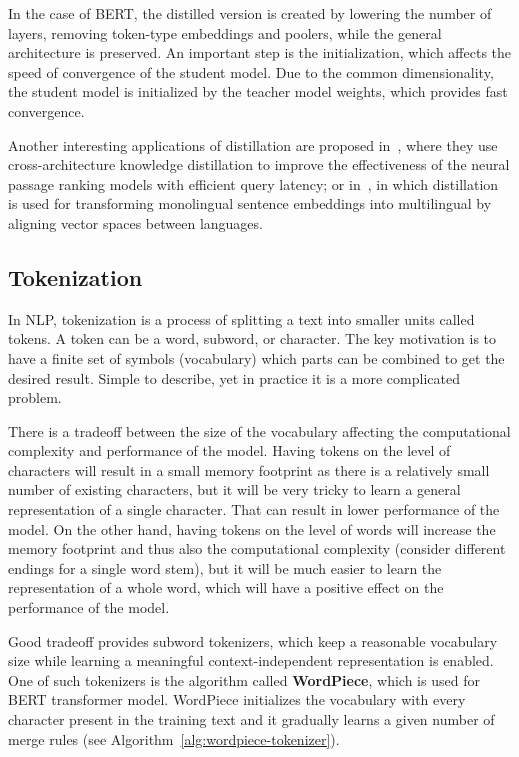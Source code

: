     In the case of BERT, the distilled version is created by lowering the number of layers, removing token-type embeddings and poolers, while the general architecture is preserved. An important step is the initialization, which affects the speed of convergence of the student model. Due to the common dimensionality, the student model is initialized by the teacher model weights, which provides fast convergence.~\parencite{Sanh2019DistilBERTAD}
    
    Another interesting applications of distillation are proposed in~\parencite{hofstaetter2020_crossarchitecture_kd}, where they use cross-architecture knowledge distillation to improve the effectiveness of the neural passage ranking models with efficient query latency; or in~\parencite{Reimers_2020-distillation-multiling}, in which distillation is used for transforming monolingual sentence embeddings into multilingual by aligning vector spaces between languages.

\subsection{Tokenization}
\label{section:tokenization}
    In NLP, tokenization is a process of splitting a text into smaller units called tokens. A token can be a word, subword, or character. The key motivation is to have a finite set of symbols (vocabulary) which parts can be combined to get the desired result. Simple to describe, yet in practice it is a more complicated problem. 
    
    There is a tradeoff between the size of the vocabulary affecting the computational complexity and performance of the model. Having tokens on the level of characters will result in  a small memory footprint as there is a relatively small number of existing characters, but it will be very tricky to learn a  general representation of a single character. That can result in lower performance of the model. On the other hand, having tokens on the level of words will increase the memory footprint and thus also the computational complexity (consider different endings for a single word stem), but it will be much easier to learn the representation of a whole word, which will have a positive effect on the performance of the model.
    
    Good tradeoff provides subword tokenizers, which keep a reasonable vocabulary size while learning a meaningful context-independent representation is enabled. One of such tokenizers is the algorithm called \textbf{WordPiece}, which is used for BERT transformer model. WordPiece initializes the vocabulary with every character present in the training text and it gradually learns a given number of merge rules (see Algorithm~\ref{alg:wordpiece-tokenizer}).
    
